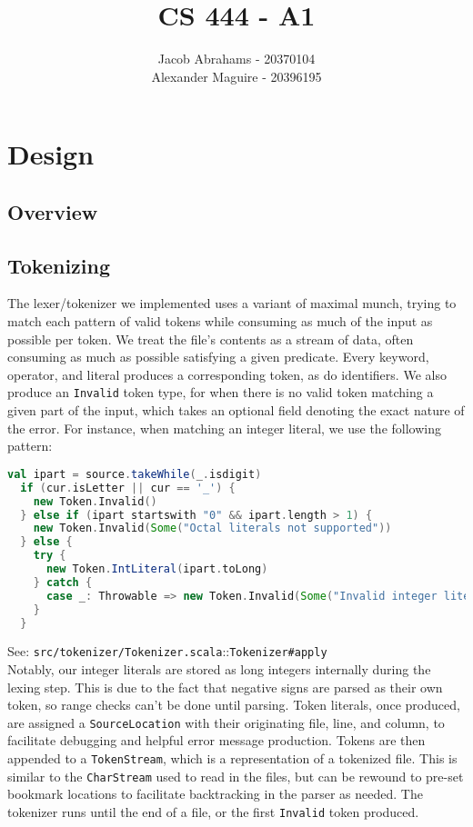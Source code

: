 \documentclass{article}
\title{CS 444 - A1}
\author{Jacob Abrahams - 20370104\\ Alexander Maguire - 20396195}
\begin{document}
\newcommand\type[1]{\texttt{#1}}
\newcommand\func[1]{\texttt{#1}}
\renewcommand\value[1]{\texttt{#1}}
\newcommand\source[2]{See: \texttt{src/#1.scala}::\type{#2} \\}
\newcommand\testsrc[1]{See: \texttt{test/#1.scala} \\}

\maketitle

\section{Design}


\subsection{Overview}


\subsection{Tokenizing}
The lexer/tokenizer we implemented uses a variant of maximal munch, trying to match each pattern of valid tokens while
consuming as much of the input as possible per token. We treat the file's contents as a stream of data, often consuming
as much as possible satisfying a given predicate. Every keyword, operator, and literal produces a corresponding token,
as do identifiers. We also produce an {\tt Invalid} token type, for when there is no valid token matching a given part
of the input, which takes an optional field denoting the exact nature of the error. For instance, when matching an
integer literal, we use the following pattern:

\begin{lstlisting}[language=Scala]
  val ipart = source.takeWhile(_.isdigit)
  if (cur.isLetter || cur == '_') {
    new Token.Invalid()
  } else if (ipart startswith "0" && ipart.length > 1) {
    new Token.Invalid(Some("Octal literals not supported"))
  } else {
    try {
      new Token.IntLiteral(ipart.toLong)
    } catch {
      case _: Throwable => new Token.Invalid(Some("Invalid integer literal "+ ipart))
    }
  }
\end{lstlisting}

\source{tokenizer/Tokenizer}{Tokenizer\#apply}

Notably, our integer literals are stored as long integers internally during the lexing step. This is due to the fact
that negative signs are parsed as their own token, so range checks can't be done until parsing. Token literals, once
produced, are assigned a {\tt SourceLocation} with their originating file, line, and column, to facilitate debugging and
helpful error message production. Tokens are then appended to a {\tt TokenStream}, which is a representation of a
tokenized file. This is similar to the {\tt CharStream} used to read in the files, but can be rewound to pre-set
bookmark locations to facilitate backtracking in the parser as needed. The tokenizer runs until the end of a file, or
the first {\tt Invalid} token produced.
\end{document}
